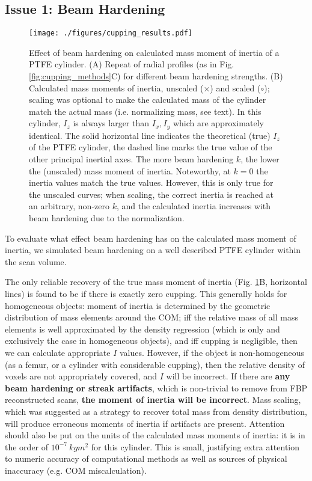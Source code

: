 \subsection{Issue 1: Beam Hardening}
\label{sec:org52ff207}

\begin{figure}[p]
\centering
\texttt{[image: ./figures/cupping\_results.pdf]}
\caption{\label{fig:cupping_results}Effect of beam hardening on calculated mass moment of inertia of a PTFE cylinder. (A) Repeat of radial profiles (as in Fig. \ref{fig:cupping_methods}C) for different beam hardening strengths. (B) Calculated mass moments of inertia, unscaled (\(\times\)) and scaled (\(\circ\)); scaling was optional to make the calculated mass of the cylinder match the actual mass (i.e. normalizing mass, see text). In this cylinder, \(I_z\) is always larger than \(I_x, I_y\) which are approximately identical. The solid horizontal line indicates the theoretical (true) \(I_z\) of the PTFE cylinder, the dashed line marks the true value of the other principal inertial axes. The more beam hardening \(k\), the lower the (unscaled) mass moment of inertia. Noteworthy, at \(k=0\) the inertia values match the true values. However, this is only true for the unscaled curves; when scaling, the correct inertia is reached at an arbitrary, non-zero \(k\), and the calculated inertia increases with beam hardening due to the normalization.}
\end{figure}

To evaluate what effect beam hardening has on the calculated mass moment of inertia, we simulated beam hardening on a well described PTFE cylinder within the scan volume.

The only reliable recovery of the true mass moment of inertia (Fig. \ref{fig:cupping_results}B, horizontal lines) is found to be if there is exactly zero cupping.
This generally holds for homogeneous objects: moment of inertia is determined by the geometric distribution of mass elements around the COM; iff the relative mass of all mass elements is well approximated by the density regression (which is only and exclusively the case in homogeneous objects), and iff cupping is negligible, then we can calculate appropriate \(I\) values.
However, if the object is non-homogeneous (as a femur, or a cylinder with considerable cupping), then the relative density of voxels are not appropriately covered, and \(I\) will be incorrect.
If there are \textbf{any beam hardening or streak artifacts}, which is non-trivial to remove from FBP reconstructed scans, \textbf{the moment of inertia will be incorrect}.
Mass scaling, which was suggested as a strategy to recover total mass from density distribution, will produce erroneous moments of inertia if artifacts are present.
Attention should also be put on the units of the calculated mass moments of inertia: it is in the order of \(10^{-7}\ kg m^2\) for this cylinder.
This is small, justifying extra attention to numeric accuracy of computational methods as well as sources of physical inaccuracy (e.g. COM miscalculation).

